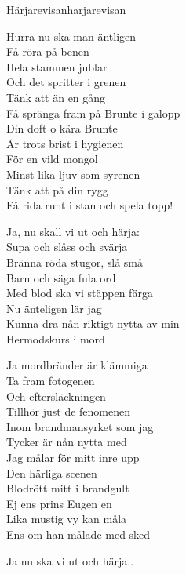 \begin{song}{Härjarevisan}{harjarevisan}
\begin{vers}
Hurra nu ska man äntligen\\
Få röra på benen\\
Hela stammen jublar\\
Och det spritter i grenen\\
Tänk att än en gång\\
Få spränga fram på Brunte i galopp\\
Din doft o kära Brunte\\
Är trots brist i hygienen\\
För en vild mongol\\
Minst lika ljuv som syrenen\\
Tänk att på din rygg\\
Få rida runt i stan och spela topp!\\
\end{vers}
\begin{vers}
    Ja, nu skall vi ut och härja:\\
    Supa och slåss och svärja\\
    Bränna röda stugor, slå små\\
    Barn och säga fula ord\\
    Med blod ska vi stäppen färga\\
    Nu änteligen lär jag\\
    Kunna dra nån riktigt nytta av min\\
    Hermodskurs i mord\\
\end{vers}
\begin{vers}
Ja mordbränder är klämmiga\\
Ta fram fotogenen\\
Och eftersläckningen\\
Tillhör just de fenomenen\\
Inom brandmansyrket som jag\\
Tycker är nån nytta med\\
Jag målar för mitt inre upp\\
Den härliga scenen\\
Blodrött mitt i brandgult\\
Ej ens prins Eugen en\\
Lika mustig vy kan måla\\
Ens om han målade med sked\\
\end{vers}
\begin{vers}
Ja nu ska vi ut och härja..\\
\end{vers}
\end{song}